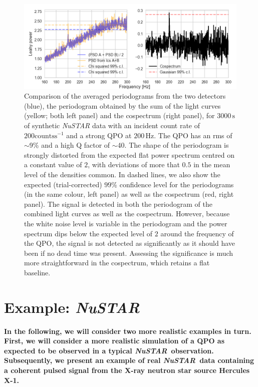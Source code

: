 \documentclass[12pt]{emulateapj}
\newcommand{\project}[1]{\textsl{#1}}
\newcommand{\nustar}{\project{NuSTAR}\xspace}
\begin{document}
\begin{figure}
\begin{center}
\includegraphics[width=\textwidth]{qpo.png}
\caption{Comparison of the averaged periodograms from the two detectors (blue), the periodogram obtained by the sum of the light curves (yellow; both left panel) and the cospectrum (right panel), for $3000\,\mathrm{s}$ of synthetic \nustar data with an incident count rate of $200 \mathrm{counts}\mathrm{s}^{-1}$ and a strong QPO at $200\,\mathrm{Hz}$. 
The QPO has an rms of $\sim$9\% and a high Q factor of $\sim$40. The shape of the periodogram is strongly distorted from the expected flat power spectrum centred on a constant value of $2$, with deviations of more that $0.5$ in the mean level of the densities common. In dashed lines, we also show the expected (trial-corrected) $99\%$ confidence level for the periodograms (in the same colour, left panel) as well as the cospectrum (red, right panel). The signal is detected in both the periodogram of the combined light curves as well as the cospectrum. However, because the white noise level is variable in the periodogram and the power spectrum dips below the expected level of $2$ around the frequency of the QPO, the signal is not detected as significantly as it should have been if no dead time was present. Assessing the significance is much more straightforward in the cospectrum, which retains a flat baseline.
}
\label{fig:qpo}
\end{center}
\end{figure}


\section{Example: \nustar}
\label{sec:nustarqpo}

\textbf{In the following, we will consider two more realistic examples in turn. First, we will consider a more realistic simulation of a QPO as expected to be observed in a typical \nustar\ observation. Subsequently, we present an example of real \nustar\ data containing a coherent pulsed signal from the X-ray neutron star source Hercules X-1.}
\end{document}
